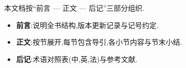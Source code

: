 

本文档按``前言 — 正文 — 后记''三部分组织.

\begin{itemize}
    \item \textbf{前言}:说明全书结构,版本更新记录与记号约定.
    \item \textbf{正文}:按节展开,每节包含导引,各小节内容与节末小结.
    \item \textbf{后记}:术语对照表(中,英,法)与参考文献.
\end{itemize}
